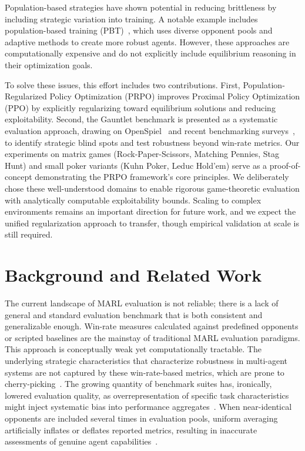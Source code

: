 \documentclass[sigconf,anonymous]{aamas}
\begin{document}
Population-based strategies have shown potential in reducing brittleness by including strategic variation into training. A notable example includes population-based training (PBT)~\cite{Jaderberg2017}, which uses diverse opponent pools and adaptive methods to create more robust agents. However, these approaches are computationally expensive and do not explicitly include equilibrium reasoning in their optimization goals.

To solve these issues, this effort includes two contributions. First, Population-Regularized Policy Optimization (PRPO) improves Proximal Policy Optimization (PPO) by explicitly regularizing toward equilibrium solutions and reducing exploitability. Second, the Gauntlet benchmark is presented as a systematic evaluation approach, drawing on OpenSpiel~\cite{Lanctot2019OpenSpielOS} and recent benchmarking surveys~\cite{Zhang2024Survey}, to identify strategic blind spots and test robustness beyond win-rate metrics. Our experiments on matrix games (Rock-Paper-Scissors, Matching Pennies, Stag Hunt) and small poker variants (Kuhn Poker, Leduc Hold'em) serve as a proof-of-concept demonstrating the PRPO framework's core principles. We deliberately chose these well-understood domains to enable rigorous game-theoretic evaluation with analytically computable exploitability bounds. Scaling to complex environments remains an important direction for future work, and we expect the unified regularization approach to transfer, though empirical validation at scale is still required.


\section{Background and Related Work}

The current landscape of MARL evaluation is not reliable; there is a lack of general and standard evaluation benchmark that is both consistent and generalizable enough. Win-rate measures calculated against predefined opponents or scripted baselines are the mainstay of traditional MARL evaluation paradigms. This approach is conceptually weak yet computationally tractable. The underlying strategic characteristics that characterize robustness in multi-agent systems are not captured by these win-rate-based metrics, which are prone to cherry-picking~\cite{McAleer2020,Omidshafiei2019}. The growing quantity of benchmark suites has, ironically, lowered evaluation quality, as overrepresentation of specific task characteristics might inject systematic bias into performance aggregates~\cite{Lanctot2019OpenSpielOS,Ellis2023}. When near-identical opponents are included several times in evaluation pools, uniform averaging artificially inflates or deflates reported metrics, resulting in inaccurate assessments of genuine agent capabilities~\cite{McAleer2020}.
\end{document}
